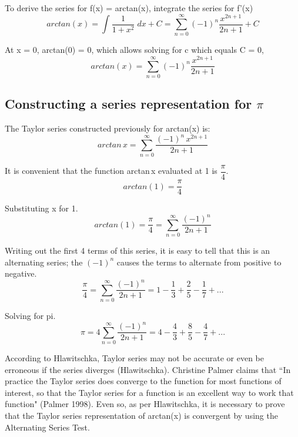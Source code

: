 \documentclass[12pt, titlepage]{article}
\begin{document}
To derive the series for f(x) = arctan(x), integrate the series for f'(x)
\begin{equation}
    arctan(x) = \int \frac{1}{1+x^{2}} \; dx + C = \sum_{n=0}^{\infty} (-1)^{n}\frac{x^{2n+1}}{2n+1} + C
\end{equation}

At x = 0, arctan(0) = 0, which allows solving for c which equals C = 0,
\begin{equation}
    arctan(x) = \sum_{n=0}^{\infty} (-1)^{n}\frac{x^{2n+1}}{2n+1} 
\end{equation}

\subsection{Constructing a series representation for \(\pi\)}
The Taylor series constructed previously for arctan(x) is:
\begin{equation}
    arctan\,x = \sum^{\infty}_{n=0} \frac{(-1)^{n}\,x^{2n+1}}{2n+1}
\end{equation}

It is convenient that the function arctan\,x evaluated at 1 is \(\dfrac{\pi}{4}\).
\begin{equation}
    arctan(1) = \frac{\pi}{4}
\end{equation}

Substituting x for 1.
\begin{equation}
    arctan(1) = \frac{\pi}{4} = \sum_{n=0}^\infty{ \frac{(-1)^n}{2n+1}}
\end{equation}

Writing out the first 4 terms of this series, it is easy to tell that this is an alternating series; the \((-1)^{n}\) causes the terms to alternate from positive to negative.
\begin{equation}
    \frac{\pi}{4} =\sum_{n=0}^\infty{ \frac{(-1)^n}{2n+1} = 1 - \frac{1}{3} + \frac{2}{5} - \frac{1}{7} + ... }
\end{equation}

Solving for pi.
\begin{equation}
    \pi = 4 \sum_{n=0}^\infty{ \frac{(-1)^n}{2n+1} = 4 - \frac{4}{3} + \frac{8}{5} - \frac{4}{7} + ... }
\end{equation}

According to Hlawitschka, Taylor series may not be accurate or even be erroneous if the series diverges (Hlawitschka). Christine Palmer claims that ``In practice the Taylor series does converge to the function for most functions of interest, so that the Taylor series for a function is an excellent way to work that function" (Palmer 1998). Even so, as per Hlawitschka, it is necessary to prove that the Taylor series representation of arctan(x) is convergent by using the Alternating Series Test.
\end{document}
